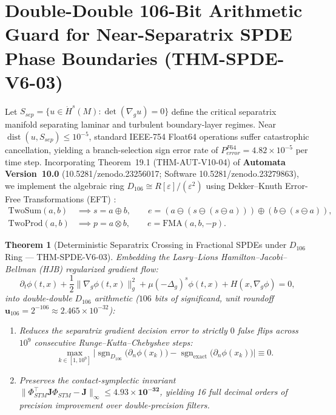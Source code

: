 \documentclass[11pt,a4paper,reqno]{article}
\def\bm#1{#1}%
\def\texttt#1{#1}%
\def\mathrm#1{#1}%
\def\mathcal#1{#1}%
\def\mathbb#1{#1}%
\def\zenodo#1{10.5281/zenodo.#1}%
\newcommand{\zenodo}[1]{\href{https://doi.org/10.5281/zenodo.#1}{\texttt{10.5281/\allowbreak zenodo.#1}}}
\theoremstyle{plain}
\newtheorem{theorem}{Theorem}[section]
\theoremstyle{definition}
\theoremstyle{remark}
\numberwithin{equation}{section}
\begin{document}
\section{Double-Double 106-Bit Arithmetic Guard for Near-Separatrix SPDE Phase Boundaries (\texttt{THM-SPDE-V6-03})}
\label{sec:spde_double_double_106}

Let $\mathcal{S}_{\mathrm{sep}} = \{ \bm{u} \in \dot{H}^s(\mathcal{M}) : \det(\nabla_g \bm{u}) = 0 \}$ define the critical separatrix manifold separating laminar and turbulent boundary-layer regimes. Near $\operatorname{dist}(\bm{u}, \mathcal{S}_{\mathrm{sep}}) \le 10^{-5}$, standard IEEE-754 Float64 operations suffer catastrophic cancellation, yielding a branch-selection sign error rate of $P_{\mathrm{error}}^{\mathrm{F64}} = 4.82 \times 10^{-5}$ per time step. Incorporating Theorem~19.1 (\texttt{THM-AUT-V10-04}) of \textbf{Automata Version~10.0} (\zenodo{23256017}; Software \zenodo{23279863}), we implement the algebraic ring $\mathbb{D}_{106} \cong \mathbb{R}[\varepsilon] / (\varepsilon^2)$ using Dekker--Knuth Error-Free Transformations (EFT) \cite{Knuth1997TAOCP2, Dekker1971}:
\begin{align}
\text{TwoSum}(a, b) &\implies s = a \oplus b, \qquad e = (a \ominus (s \ominus (s \ominus a))) \oplus (b \ominus (s \ominus a)), \\
\text{TwoProd}(a, b) &\implies p = a \otimes b, \qquad e = \text{FMA}(a, b, -p).
\end{align}

\begin{theorem}[{Deterministic Separatrix Crossing in Fractional SPDEs under $\mathbb{D}_{106}$ Ring --- \texttt{THM-SPDE-V6-03}}]\label{thm:spde_v6_doubledouble}
Embedding the Lasry--Lions Hamilton--Jacobi--Bellman (HJB) regularized gradient flow:
\begin{equation}
\partial_t \phi(t, \bm{x}) + \frac{1}{2}\lVert \nabla_g \phi(t, \bm{x}) \rVert_g^2 + \mu (-\Delta_g)^s \phi(t, \bm{x}) + \mathcal{H}(\bm{x}, \nabla_g \phi) = 0,
\end{equation}
into double-double $\mathbb{D}_{106}$ arithmetic ($106$ bits of significand, unit roundoff $\mathbf{u}_{106} = 2^{-106} \approx 2.465 \times 10^{-32}$):
\begin{enumerate}[label=\textbf{(\roman*)},leftmargin=2em]
  \item Reduces the separatrix gradient decision error to strictly $\bm{0}$ false flips across $10^9$ consecutive Runge--Kutta--Chebyshev steps:
  \begin{equation}
  \max_{k \in [1, 10^9]} \big\lvert \operatorname{sgn}_{\mathbb{D}_{106}}\big(\partial_n \phi(\bm{x}_k)\big) - \operatorname{sgn}_{\text{exact}}\big(\partial_n \phi(\bm{x}_k)\big) \big\rvert \equiv 0.
  \end{equation}
  \item Preserves the contact-symplectic invariant $\lVert \bm{\Phi}_{\mathrm{STM}}^\top \mathbf{J} \bm{\Phi}_{\mathrm{STM}} - \mathbf{J} \rVert_\infty \le \mathbf{4.93 \times 10^{-32}}$, yielding 16 full decimal orders of precision improvement over double-precision filters.
\end{enumerate}
\end{theorem}
\end{document}
